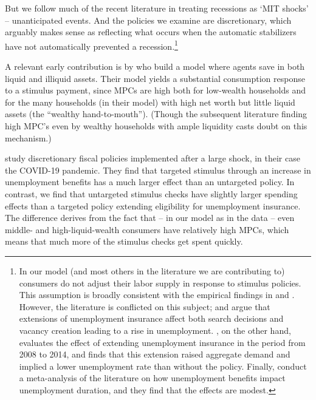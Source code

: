 \documentclass[\econtexRoot/HAFiscal]{subfiles}
\begin{document}
But we follow much of the recent literature in treating recessions as `MIT shocks' -- unanticipated events. And the policies we examine are discretionary, which arguably makes sense as reflecting what occurs when the automatic stabilizers have not automatically prevented a recession.\footnote{
  In our model (and most others in the literature we are contributing to) consumers do not adjust their labor supply in response to stimulus policies. 
  This assumption is broadly consistent with the empirical findings in \cite{ganong2022spending} and \cite{chodorow2016limited}.
  However, the literature is conflicted on this subject; \cite{hagedorn2017impact} and \cite{hagedorn2019unemployment} argue that extensions of unemployment insurance affect both search decisions and vacancy creation leading to a rise in unemployment. 
\cite{kekre2022unemp}, on the other hand, evaluates the effect of extending unemployment insurance in the period from 2008 to 2014, and finds that this extension raised aggregate demand and implied a lower unemployment rate than without the policy. 
Finally, \cite{cohenDisemployment} conduct a meta-analysis of the literature on how unemployment benefits impact unemployment duration, and they find that the effects are modest.}

A relevant early contribution is by \cite{kaplan2014model} who build a model where agents save in both liquid and illiquid assets. %
Their model yields a substantial consumption response to a stimulus payment, since MPCs are high both for low-wealth households and for the many households (in their model) with high net worth but little liquid assets (the ``wealthy hand-to-mouth'').  (Though the subsequent literature finding high MPC's even by wealthy households with ample liquidity casts doubt on this mechanism.)

\cite{bayercoronavirus} study discretionary fiscal policies implemented after a large shock, in their case the COVID-19 pandemic. %
They find that targeted stimulus through an increase in unemployment benefits has a much larger effect than an untargeted policy.
In contrast, we find that untargeted stimulus checks have slightly larger spending effects than a targeted policy extending eligibility for unemployment insurance. %
The difference derives from the fact that -- in our model as in the data -- even middle- and high-liquid-wealth consumers have relatively high MPCs, which means that much more of the stimulus checks get spent quickly.
\end{document}
